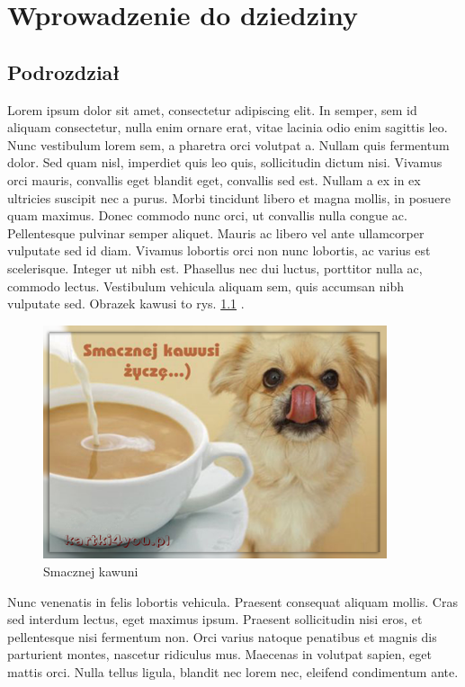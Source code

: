 \chapter{Wprowadzenie do dziedziny}
\label{chap:field}




\section{Podrozdział}
Lorem ipsum dolor sit amet, consectetur adipiscing elit. In semper, sem id aliquam consectetur, nulla enim ornare erat, vitae lacinia odio enim sagittis leo. Nunc vestibulum lorem sem, a pharetra orci volutpat a. Nullam quis fermentum dolor. Sed quam nisl, imperdiet quis leo quis, sollicitudin dictum nisi. Vivamus orci mauris, convallis eget blandit eget, convallis sed est. Nullam a ex in ex ultricies suscipit nec a purus. Morbi tincidunt libero et magna mollis, in posuere quam maximus. Donec commodo nunc orci, ut convallis nulla congue ac. Pellentesque pulvinar semper aliquet. Mauris ac libero vel ante ullamcorper vulputate sed id diam. Vivamus lobortis orci non nunc lobortis, ac varius est scelerisque. Integer ut nibh est. Phasellus nec dui luctus, porttitor nulla ac, commodo lectus. Vestibulum vehicula aliquam sem, quis accumsan nibh vulputate sed. Obrazek kawusi to rys. \ref{fig:coffee} \cite{dx12_2}.

\begin{figure}[htbp]
    \centering
    \includegraphics[width=0.9\textwidth]{images/kawunia.png}
    \caption{Smacznej kawuni}
    \label{fig:coffee}
\end{figure}

Nunc venenatis in felis lobortis vehicula. Praesent consequat aliquam mollis. Cras sed interdum lectus, eget maximus ipsum. Praesent sollicitudin nisi eros, et pellentesque nisi fermentum non. Orci varius natoque penatibus et magnis dis parturient montes, nascetur ridiculus mus. Maecenas in volutpat sapien, eget mattis orci. Nulla tellus ligula, blandit nec lorem nec, eleifend condimentum ante.

